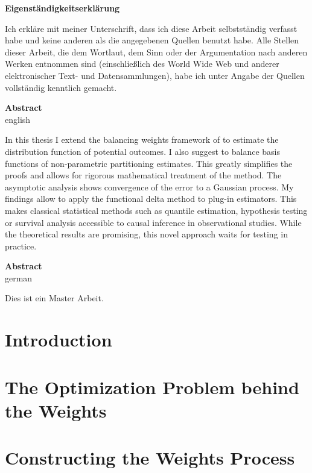 \documentclass[11pt, a4paper, BCOR=10mm, DIV=11]{scrbook}
\theoremstyle{definition}
\theoremstyle{plain}
\begin{document}
\newpage
\begin{center}
\textbf{
Eigenständigkeitserklärung
}
\end{center}
Ich erkläre mit meiner Unterschrift,
dass ich diese Arbeit selbstständig verfasst habe und keine
anderen als die angegebenen Quellen benutzt habe.
Alle Stellen dieser Arbeit, die dem Wortlaut,
dem Sinn oder der Argumentation nach anderen Werken entnommen sind 
(einschließlich des World
Wide Web und anderer elektronischer Text- und Datensammlungen), habe ich unter Angabe der
Quellen vollständig kenntlich gemacht.
\newpage
  \begin{center}
  \textbf{Abstract} \\
  english
  \end{center}
  In this thesis I extend the balancing weights framework of \cite{Wang2019} to estimate the distribution function of potential outcomes.
  I also suggest to balance basis functions of non-parametric partitioning estimates. 
  This greatly simplifies the proofs and allows for rigorous mathematical treatment of the method.
  The asymptotic analysis shows convergence of the error to a Gaussian process.
  My findings allow to apply the functional delta method to plug-in estimators.
  This makes classical statistical methods such as quantile estimation, hypothesis testing or survival analysis accessible to causal inference in observational studies.
  While the theoretical results are promising, this novel approach waits for testing in practice.
\newpage
  \begin{center}
  \textbf{Abstract}
  \\
  german
  \end{center}
  Dies ist ein Master Arbeit.

\tableofcontents 

\chapter{Introduction}
  
\chapter{The Optimization Problem behind the Weights}
  
\chapter{Constructing the Weights Process}
  
  
\end{document}
